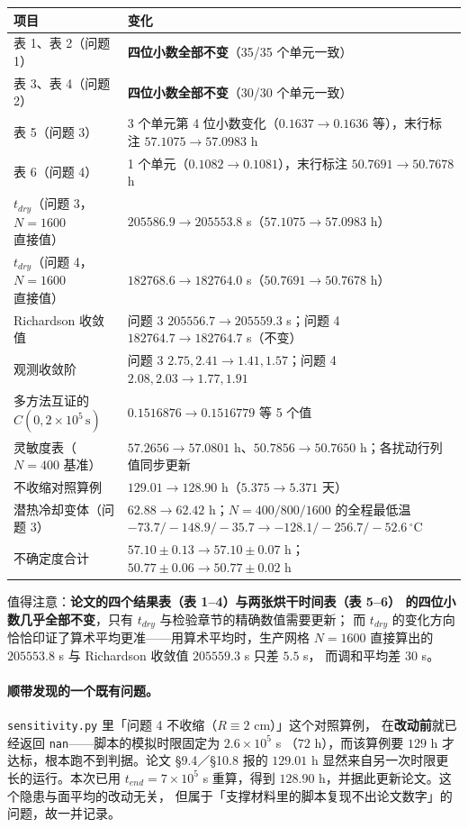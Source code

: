 \documentclass[11pt,a4paper]{ctexart}
\newcommand{\src}[1]{\texttt{#1}}
\begin{document}
\begin{center}
\small
\begin{tabular}{@{}p{}p{}@{}}
\toprule
项目 & 变化 \\
\midrule
表 1、表 2（问题 1） & \textbf{四位小数全部不变}（35/35 个单元一致） \\
表 3、表 4（问题 2） & \textbf{四位小数全部不变}（30/30 个单元一致） \\
表 5（问题 3） & 3 个单元第 4 位小数变化（$0.1637\to0.1636$ 等），末行标注 $57.1075\to57.0983$ h \\
表 6（问题 4） & 1 个单元（$0.1082\to0.1081$），末行标注 $50.7691\to50.7678$ h \\
$t_{dry}$（问题 3，$N=1600$ 直接值） & $205586.9\to205553.8$ s（$57.1075\to57.0983$ h） \\
$t_{dry}$（问题 4，$N=1600$ 直接值） & $182768.6\to182764.0$ s（$50.7691\to50.7678$ h） \\
Richardson 收敛值 & 问题 3 $205556.7\to205559.3$ s；问题 4 $182764.7\to182764.7$ s（不变） \\
观测收敛阶 & 问题 3 $2.75,2.41\to1.41,1.57$；问题 4 $2.08,2.03\to1.77,1.91$ \\
多方法互证的 $C(0,2\times10^5\,\mathrm{s})$ & $0.1516876\to0.1516779$ 等 5 个值 \\
灵敏度表（$N=400$ 基准） & $57.2656\to57.0801$ h、$50.7856\to50.7650$ h；各扰动行列值同步更新 \\
不收缩对照算例 & $129.01\to128.90$ h（$5.375\to5.371$ 天） \\
潜热冷却变体（问题 3） & $62.88\to62.42$ h；$N=400/800/1600$ 的全程最低温
  $-73.7/-148.9/-35.7\to-128.1/-256.7/-52.6\,^\circ$C \\
不确定度合计 & $57.10\pm0.13\to57.10\pm0.07$ h；$50.77\pm0.06\to50.77\pm0.02$ h \\
\bottomrule
\end{tabular}
\end{center}

\noindent 值得注意：\textbf{论文的四个结果表（表 1--4）与两张烘干时间表（表 5--6）
的四位小数几乎全部不变}，只有 $t_{dry}$ 与检验章节的精确数值需要更新；
而 $t_{dry}$ 的变化方向恰恰印证了算术平均更准——用算术平均时，生产网格 $N=1600$
直接算出的 $205553.8$ s 与 Richardson 收敛值 $205559.3$ s 只差 $5.5$ s，
而调和平均差 $30$ s。

\paragraph{顺带发现的一个既有问题。}
\src{sensitivity.py} 里「问题 4 不收缩（$R\equiv2$ cm）」这个对照算例，
在\textbf{改动前}就已经返回 \src{nan}——脚本的模拟时限固定为 $2.6\times10^5$ s
（$72$ h），而该算例要 $129$ h 才达标，根本跑不到判据。论文 §9.4／§10.8 报的
$129.01$ h 显然来自另一次时限更长的运行。本次已用 $t_{end}=7\times10^5$ s
重算，得到 $128.90$ h，并据此更新论文。这个隐患与面平均的改动无关，
但属于「支撑材料里的脚本复现不出论文数字」的问题，故一并记录。
\end{document}
